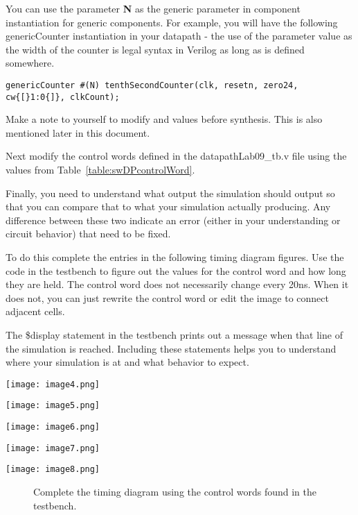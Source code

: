 You can use the parameter \textbf{N} as the generic parameter in
component instantiation for generic components. For example,
you will have the following genericCounter instantiation in your
datapath - the use of the parameter value  as the width of the
counter is legal syntax in Verilog as long as  is defined somewhere.

\begin{verbatim}
genericCounter #(N) tenthSecondCounter(clk, resetn, zero24, cw{[}1:0{]}, clkCount);
\end{verbatim}

Make a note to yourself to modify  and
 values before synthesis. This is also
mentioned later in this document.

Next modify the control words defined in the datapathLab09\_tb.v file
using the values from Table~\ref{table:swDPcontrolWord}.

Finally, you need to understand what output the simulation should output
so that you can compare that to what your simulation actually producing.
Any difference between these two indicate an error (either in your
understanding or circuit behavior) that need to be fixed.

To do this complete the entries in the following timing diagram figures.
Use the code in the testbench to figure out the values for the control
word and how long they are held. The control word does not necessarily
change every 20ns. When it does not, you can just rewrite the control
word or edit the image to connect adjacent cells.

The \$display statement in the testbench prints out a message when that
line of the simulation is reached. Including these statements helps you
to understand where your simulation is at and what behavior to expect.

\begin{landscape}
    \texttt{[image:  image4.png]}

    \texttt{[image:  image5.png]}

    \texttt{[image:  image6.png]}

    \texttt{[image:  image7.png]}

    \texttt{[image:  image8.png]}

    \begin{figure}[ht]
        \caption{Complete the timing diagram using the control words found in the testbench.}
        \label{figure:swDPtiming}
    \end{figure}

\end{landscape}


